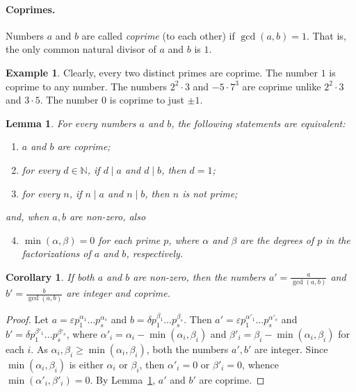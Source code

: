 \documentclass[12pt,notitlepage]{article}
\theoremstyle{plain}
\newtheorem{lemma}[thm]{Lemma}
\newtheorem{corr}[thm]{Corollary}
\theoremstyle{definition}
\newtheorem{exm}[thm]{Example}
\theoremstyle{plain}
\newcommand{\N}{\mathbb{N}}
\newcommand{\eps}{\varepsilon}
\newcommand{\1}{\mathbf{1}}
\newcommand{\0}{\mathbf{0}}
\newcommand{\dvd}{\mathop{\mid}}
\begin{document}
\paragraph{Coprimes.} Numbers $a$ and $b$ are called \emph{coprime} (to each other) if $\gcd(a, b) = 1$. That is, the only common natural divisor of $a$ and $b$ is $1$.
\begin{exm}
Clearly, every two distinct primes are coprime. The number $1$ is coprime to any number. The numbers $2^2 \cdot 3$ and $- 5 \cdot 7^3$ are coprime unlike $2^2 \cdot 3$ and $3 \cdot 5$. The number $0$ is coprime to just $\pm 1$.
\end{exm}

\begin{lemma}\label{L5:coprime}
For every numbers $a$ and $b$, the following statements are equivalent:
\begin{enumerate}
\item $a$ and $b$ are coprime;
\item for every $d \in \N$, if $d \dvd a$ and $d \dvd b$, then $d = 1$;
\item for every $n$, if $n \dvd a$ and $n \dvd b$, then $n$ is not prime;
\end{enumerate}
and, when $a, b$ are non-zero, also
\begin{enumerate}
\setcounter{enumi}{3}
\item $\min(\alpha, \beta) = 0$ for each prime $p$, where $\alpha$ and $\beta$ are the degrees of $p$ in the factorizations of $a$ and $b$, respectively.
\end{enumerate}
\end{lemma}

\begin{corr}
If both $a$ and $b$ are non-zero, then the numbers $a' = \frac{a}{\gcd(a, b)}$ and $b' = \frac{b}{\gcd(a, b)}$ are integer and coprime.
\end{corr}
\begin{proof}
Let $a = \eps p^{\alpha_1}_1\ldots p^{\alpha_s}_s$ and $b = \delta p^{\beta_1}_1\ldots p^{\beta_s}_s$. Then $a' = \eps p^{\alpha'_1}_1\ldots p^{\alpha'_s}_s$ and $b' = \delta p^{\beta'_1}_1\ldots p^{\beta'_s}_s$, where $\alpha'_i = \alpha_i - \min(\alpha_i, \beta_i)$ and $\beta'_i = \beta_i - \min(\alpha_i, \beta_i)$ for each $i$. As $\alpha_i, \beta_i \geq \min(\alpha_i, \beta_i)$, both the numbers $a', b'$ are integer. Since $\min(\alpha_i, \beta_i)$ is either $\alpha_i$ or $\beta_i$, then $\alpha'_i = 0$ or $\beta'_i = 0$, whence $\min(\alpha'_i, \beta'_i) = 0$. By Lemma~\ref{L5:coprime}, $a'$ and $b'$ are coprime.
\end{proof}
\end{document}
